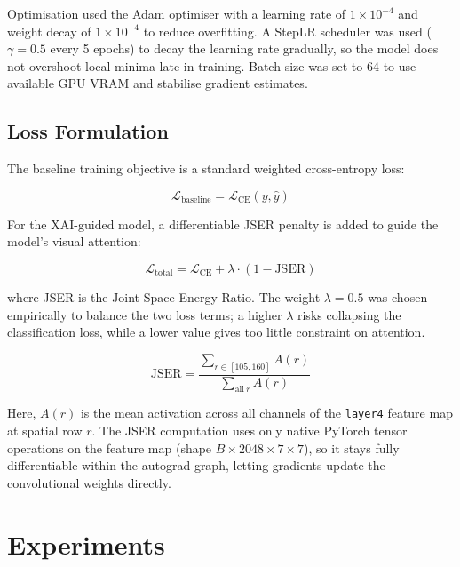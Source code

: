 \documentclass[conference]{IEEEtran}
\begin{document}
Optimisation used the Adam optimiser with a learning rate of $1 \times 10^{-4}$ and weight decay of $1 \times 10^{-4}$ to reduce overfitting. A StepLR scheduler was used ($\gamma = 0.5$ every 5 epochs) to decay the learning rate gradually, so the model does not overshoot local minima late in training. Batch size was set to 64 to use available GPU VRAM and stabilise gradient estimates.

\subsection{Loss Formulation}
The baseline training objective is a standard weighted cross-entropy loss:

\begin{equation}
  \mathcal{L}_{\text{baseline}} = \mathcal{L}_{\text{CE}}(y, \hat{y})
\end{equation}

For the XAI-guided model, a differentiable JSER penalty is added to guide the model's visual attention:

\begin{equation}
  \mathcal{L}_{\text{total}} = \mathcal{L}_{\text{CE}}
    + \lambda \cdot (1 - \text{JSER})
\end{equation}

where JSER is the Joint Space Energy Ratio. The weight $\lambda = 0.5$ was chosen empirically to balance the two loss terms; a higher $\lambda$ risks collapsing the classification loss, while a lower value gives too little constraint on attention.

\begin{equation}
  \text{JSER} = \frac{\sum_{r \in [105,160]} A(r)}
                     {\sum_{\text{all}~r} A(r)}
\end{equation}

Here, $A(r)$ is the mean activation across all channels of the \texttt{layer4} feature map at spatial row $r$. The JSER computation uses only native PyTorch tensor operations on the feature map (shape $B \times 2048 \times 7 \times 7$), so it stays fully differentiable within the autograd graph, letting gradients update the convolutional weights directly.

\section{Experiments}
\label{sec:experiments}
\end{document}
